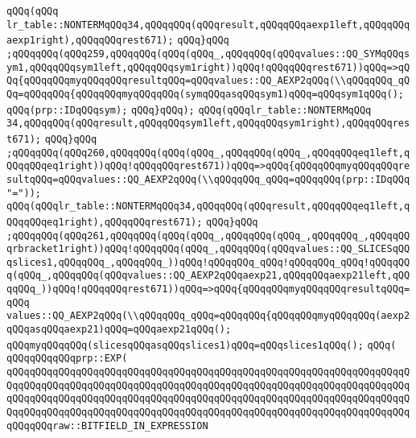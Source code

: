 \verb|qQQq(qQQq|\newline
\verb|lr_table::NONTERMqQQq34,qQQqqQQq(qQQqresult,qQQqqQQqaexp1left,qQQqqQQqaexp1right),qQQqqQQqrest671);|\newline
\verb|qQQq}qQQq|\newline
\verb|;qQQqqQQq(qQQq259,qQQqqQQq(qQQq(qQQq_,qQQqqQQq(qQQqvalues::QQ_SYMqQQqsym1,qQQqqQQqsym1left,qQQqqQQqsym1right))qQQq!qQQqqQQqrest671))qQQq=>qQQq{qQQqqQQqmyqQQqqQQqresultqQQq=qQQqvalues::QQ_AEXP2qQQq(\\qQQqqQQq_qQQq=qQQqqQQq{qQQqqQQqmyqQQqqQQq(symqQQqasqQQqsym1)qQQq=qQQqsym1qQQq();|\newline
\verb|qQQq(prp::IDqQQqsym);|\newline
\verb|qQQq}qQQq);|\newline
\verb|qQQq(qQQqlr_table::NONTERMqQQq|\newline
\verb|34,qQQqqQQq(qQQqresult,qQQqqQQqsym1left,qQQqqQQqsym1right),qQQqqQQqrest671);|\newline
\verb|qQQq}qQQq|\newline
\verb|;qQQqqQQq(qQQq260,qQQqqQQq(qQQq(qQQq_,qQQqqQQq(qQQq_,qQQqqQQqeq1left,qQQqqQQqeq1right))qQQq!qQQqqQQqrest671))qQQq=>qQQq{qQQqqQQqmyqQQqqQQqresultqQQq=qQQqvalues::QQ_AEXP2qQQq(\\qQQqqQQq_qQQq=qQQqqQQq(prp::IDqQQq"="));|\newline
\verb|qQQq(qQQqlr_table::NONTERMqQQq34,qQQqqQQq(qQQqresult,qQQqqQQqeq1left,qQQqqQQqeq1right),qQQqqQQqrest671);|\newline
\verb|qQQq}qQQq|\newline
\verb|;qQQqqQQq(qQQq261,qQQqqQQq(qQQq(qQQq_,qQQqqQQq(qQQq_,qQQqqQQq_,qQQqqQQqrbracket1right))qQQq!qQQqqQQq(qQQq_,qQQqqQQq(qQQqvalues::QQ_SLICESqQQqslices1,qQQqqQQq_,qQQqqQQq_))qQQq!qQQqqQQq_qQQq!qQQqqQQq_qQQq!qQQqqQQq(qQQq_,qQQqqQQq(qQQqvalues::QQ_AEXP2qQQqaexp21,qQQqqQQqaexp21left,qQQqqQQq_))qQQq!qQQqqQQqrest671))qQQq=>qQQq{qQQqqQQqmyqQQqqQQqresultqQQq=qQQq|\newline
\verb|values::QQ_AEXP2qQQq(\\qQQqqQQq_qQQq=qQQqqQQq{qQQqqQQqmyqQQqqQQq(aexp2qQQqasqQQqaexp21)qQQq=qQQqaexp21qQQq();|\newline
\verb|qQQqmyqQQqqQQq(slicesqQQqasqQQqslices1)qQQq=qQQqslices1qQQq();|\newline
\verb|qQQq(|\newline
\verb|qQQqqQQqqQQqprp::EXP(|\newline
\verb|qQQqqQQqqQQqqQQqqQQqqQQqqQQqqQQqqQQqqQQqqQQqqQQqqQQqqQQqqQQqqQQqqQQqqQQqqQQqqQQqqQQqqQQqqQQqqQQqqQQqqQQqqQQqqQQqqQQqqQQqqQQqqQQqqQQqqQQqqQQqqQQqqQQqqQQqqQQqqQQqqQQqqQQqqQQqqQQqqQQqqQQqqQQqqQQqqQQqqQQqqQQqqQQqqQQqqQQqqQQqqQQqqQQqqQQqqQQqqQQqqQQqqQQqqQQqqQQqqQQqqQQqqQQqqQQqqQQqqQQqqQQqqQQqraw::BITFIELD_IN_EXPRESSION|\newline
